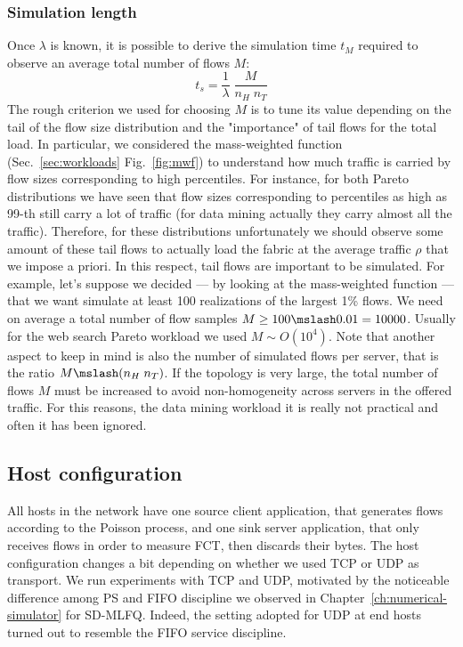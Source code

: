 \subsubsection{Simulation length}
Once $\lambda$ is known, it is possible to derive the simulation time $t_M$ required to observe an average total number of flows $M$:
\[
t_s = \dfrac{1}{\lambda}\;\frac{M}{n_H \; n_T}
\]
The rough criterion we used for choosing $M$ is to tune its value depending on the tail of the flow size distribution and the "importance" of tail flows for the total load. In particular, we considered the mass-weighted function (Sec.~\ref{sec:workloads} Fig.~\ref{fig:mwf}) to understand how much traffic is carried by flow sizes corresponding to high percentiles. For instance, for both Pareto distributions we have seen that flow sizes corresponding to percentiles as high as 99-th still carry a lot of traffic (for data mining actually they carry almost all the traffic). Therefore, for these distributions unfortunately we should observe some amount of these tail flows to actually load the fabric at the average traffic $\rho$ that we impose a priori. In this respect, tail flows are important to be simulated. For example, let's suppose we decided --- by looking at the mass-weighted function --- that we want simulate at least 100 realizations of the largest 1\% flows. We need on average a total number of flow samples $M \ge 100 \mslash 0.01 = 10000$. Usually for the web search Pareto workload we used $M \sim O(10^{4})$. Note that another aspect to keep in mind is also the number of simulated flows per server, that is the ratio $M \mslash (n_H \; n_T)$. If the topology is very large, the total number of flows $M$ must be increased to avoid non-homogeneity across servers in the offered traffic. For this reasons, the data mining workload it is really not practical and often it has been ignored.
\subsection{Host configuration}
\label{sec:host-config}
All hosts in the network have one source client application, that generates flows according to the Poisson process, and one sink server application, that only receives flows in order to measure FCT, then discards their bytes. The host configuration changes a bit depending on whether we used TCP or UDP as transport. We run experiments with TCP and UDP, motivated by the noticeable difference among PS and FIFO discipline we observed in Chapter~\ref{ch:numerical-simulator} for SD-MLFQ. Indeed, the setting adopted for UDP at end hosts turned out to resemble the FIFO service discipline. 
